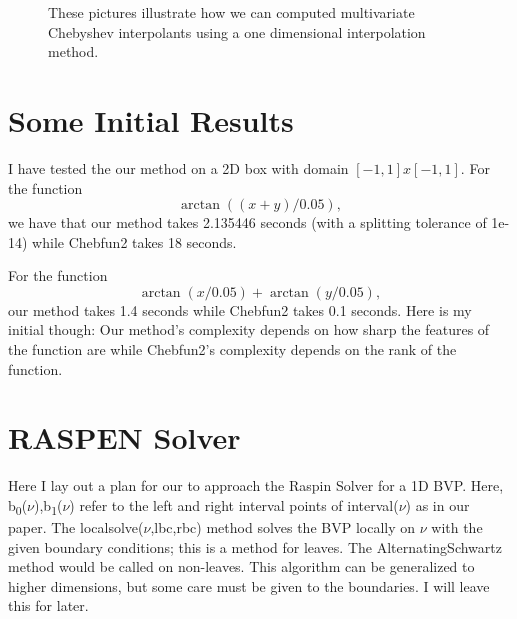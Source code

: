 \documentclass{article}
\newcommand{\bound}[1]{b\textsubscript{#1}}
\begin{document}
\begin{figure}[!htb]
\caption{These pictures illustrate how we can computed multivariate Chebyshev interpolants using a one dimensional interpolation method.
}
\label{MULTI_INTERP}
\end{figure}

\section{Some Initial Results}
I have tested the our method on a  2D box with domain $[-1,1]x[-1,1]$. For the function
\begin{equation}
\arctan((x+y)/0.05),
\end{equation}
we have that our method takes 2.135446 seconds (with a splitting tolerance of 1e-14) while Chebfun2 takes 18 seconds.

For the function
\begin{equation}
\arctan(x/0.05)+\arctan(y/0.05),
\end{equation}
our method takes 1.4 seconds while Chebfun2 takes 0.1 seconds. Here is my initial though: Our method's complexity depends on how sharp the features of the function are while Chebfun2's complexity depends on the rank of the function.

\section{RASPEN Solver}
Here I lay out a plan for our to approach the Raspin Solver for a 1D BVP. Here, \bound{0}($\nu$),\bound{1}($\nu$) refer to the left and right interval points of interval($\nu$) as in our paper. The localsolve($\nu$,lbc,rbc) method solves the BVP locally on $\nu$ with the given boundary conditions; this is a method for leaves. The AlternatingSchwartz method would be called on non-leaves. This algorithm can be generalized to higher dimensions, but some care must be given to the boundaries. I will leave this for later.
\end{document}
